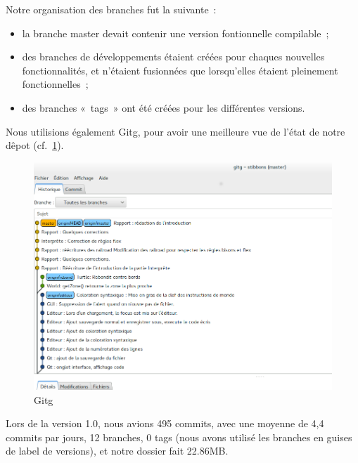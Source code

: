 Notre organisation des branches fut la suivante~:
\begin{itemize}
\item la branche master devait contenir une version fontionnelle compilable~;
\item des branches de développements étaient créées pour chaques nouvelles fonctionnalités, et n'étaient fusionnées que lorsqu'elles étaient pleinement fonctionnelles~;
\item des branches «~tags~» ont été créées pour les différentes versions.
\end{itemize}
Nous utilisions également Gitg, pour avoir une meilleure vue de l'état de notre dêpot (cf.~\ref{Gitg}).
\begin{figure}[h]
\centering
\includegraphics[scale=0.35]{doc/gestionProjet/gitbranche.png}
\caption{\label{Gitg} Gitg}
\end{figure}
Lors de la version 1.0, nous avions 495 commits, avec une moyenne de 4,4 commits par jours, 12 branches, 0 tags (nous avons utilisé les branches en guises de label de versions), et notre dossier fait 22.86MB.
